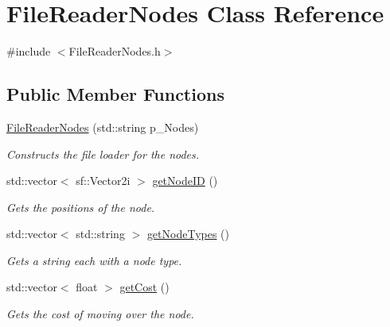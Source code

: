\hypertarget{class_file_reader_nodes}{}\section{File\+Reader\+Nodes Class Reference}
\label{class_file_reader_nodes}


{\ttfamily \#include $<$File\+Reader\+Nodes.\+h$>$}

\subsection*{Public Member Functions}
\begin{DoxyCompactItemize}
\item 
\mbox{\label{class_file_reader_nodes_ac6a6baa2a1d62b201db74cd288ce40eb}} 
\mbox{\hyperlink{class_file_reader_nodes_ac6a6baa2a1d62b201db74cd288ce40eb}{File\+Reader\+Nodes}} (std\+::string p\+\_\+\+Nodes)
\begin{DoxyCompactList}\small\item\em Constructs the file loader for the nodes. \end{DoxyCompactList}\item 
std\+::vector$<$ sf\+::\+Vector2i $>$ \mbox{\hyperlink{class_file_reader_nodes_a87231f197c15e2ef9e81e27cc9055276}{get\+Node\+ID}} ()
\begin{DoxyCompactList}\small\item\em Gets the positions of the node. \end{DoxyCompactList}\item 
\mbox{\label{class_file_reader_nodes_a1277ad182dbc6544fe60556930c517dc}} 
std\+::vector$<$ std\+::string $>$ \mbox{\hyperlink{class_file_reader_nodes_a1277ad182dbc6544fe60556930c517dc}{get\+Node\+Types}} ()
\begin{DoxyCompactList}\small\item\em Gets a string each with a node type. \end{DoxyCompactList}\item 
\mbox{\label{class_file_reader_nodes_ae75b4dd1ba8287ad904c94068f6922c2}} 
std\+::vector$<$ float $>$ \mbox{\hyperlink{class_file_reader_nodes_ae75b4dd1ba8287ad904c94068f6922c2}{get\+Cost}} ()
\begin{DoxyCompactList}\small\item\em Gets the cost of moving over the node. \end{DoxyCompactList}\end{DoxyCompactItemize}
